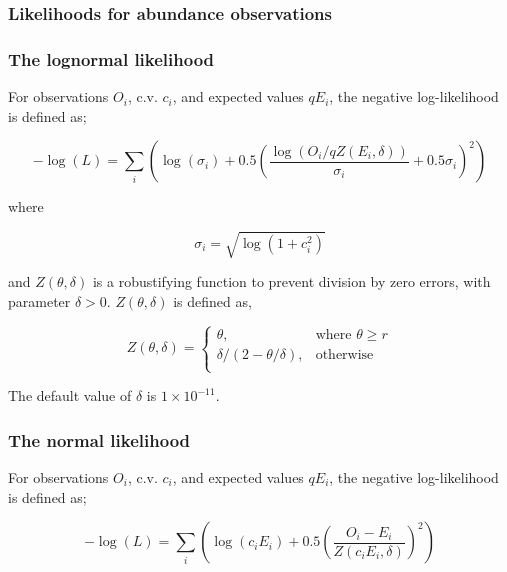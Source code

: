 \subsubsection{Likelihoods for abundance observations}

\subsubsection*{The lognormal likelihood}

For observations $O_i$, c.v. $c_i$, and expected values $qE_i$, the negative log-likelihood is defined as;

\begin{equation}
 - \log \left(L \right) = \sum\limits_i \left( \log \left( \sigma _i \right) + 0.5\left( \frac{\log \left(O_i / q Z \left(E_i,\delta \right) \right)}{\sigma_i} + 0.5 \sigma_i \right)^2 \right)
\end{equation}

where 

\begin{equation}
  \sigma_i  = \sqrt{\log \left(1+c_i^2 \right)}
\end{equation}

and $Z \left(\theta,\delta \right)$ is a robustifying function to prevent division by zero errors, with parameter $\delta>0$. $Z \left(\theta,\delta \right)$ is defined as,

\begin{equation}
   Z \left(\theta,\delta \right) = \begin{cases}
	  \theta, & \text{where $\theta \ge r$} \\
	  \delta/\left( 2-\theta/\delta \right), & \text{otherwise} \\  
  \end{cases}
\end{equation}

The default value of $\delta$ is $1 \times 10^{-11}$.

\subsubsection*{The normal likelihood}

For observations $O_i$, c.v. $c_i$, and expected values $qE_i$, the negative log-likelihood is defined as;

\begin{equation}
 - \log \left(L \right) = \sum\limits_i \left( \log \left( c_i E_i \right) +0.5 \left( \frac{O_i-E_i}{Z\left(c_i E_i,\delta \right)}\right)^2\right)
\end{equation}

